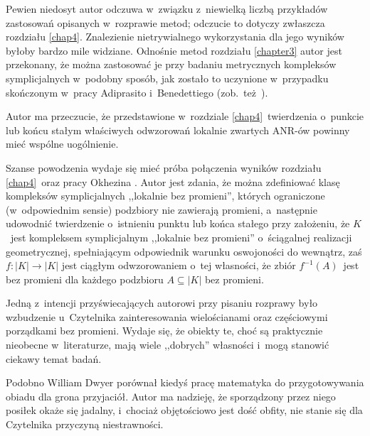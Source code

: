 Pewien niedosyt autor odczuwa w~związku z~niewielką liczbą przykładów zastosowań opisanych w~rozprawie metod; odczucie to dotyczy zwłaszcza rozdziału \ref{chap4}. Znalezienie nietrywialnego wykorzystania dla jego wyników byłoby bardzo mile widziane. Odnośnie metod rozdziału \ref{chapter3} autor jest przekonany, że można zastosować je przy badaniu metrycznych kompleksów symplicjalnych w~podobny sposób, jak zostało to uczynione w~przypadku skończonym w~pracy Adiprasito i~Benedettiego \cite{Adiprasito13} (zob.~też~\cite{Baralic}).

Autor ma przeczucie, że przedstawione w~rozdziale \ref{chap4}~twierdzenia o~punkcie lub końcu stałym właściwych odwzorowań lokalnie zwartych \mbox{ANR-ów} powinny mieć wspólne uogólnienie.

Szanse powodzenia wydaje się mieć próba połączenia wyników rozdziału \ref{chap4}~oraz pracy Okhezina \cite{Okhezin95}. Autor jest zdania, że można zdefiniować klasę kompleksów symplicjalnych ,,lokalnie bez promieni'', których ograniczone (w~odpowiednim sensie) podzbiory nie zawierają promieni, a~następnie udowodnić twierdzenie o~istnieniu punktu lub końca stałego przy założeniu, że $K$~jest kompleksem symplicjalnym ,,lokalnie bez promieni'' o~ściągalnej realizacji geometrycznej, spełniającym odpowiednik warunku oswojoności do wewnątrz, zaś $f\colon |K|\to |K|$ jest  ciągłym odwzorowaniem o~tej własności, że zbiór $f^{-1}(A)$~jest bez promieni dla każdego podzbioru $A\subseteq |K|$ bez promieni.

Jedną z~intencji przyświecających autorowi przy pisaniu rozprawy było wzbudzenie u~Czytelnika zainteresowania wielościanami oraz częściowymi porządkami bez promieni. Wydaje się, że obiekty te, choć są praktycznie nieobecne w~literaturze, mają wiele ,,dobrych'' własności i~mogą stanowić ciekawy temat badań.

Podobno \cite{178993} William Dwyer porównał kiedyś pracę matematyka do przygotowywania obiadu dla grona przyjaciół. Autor ma nadzieję, że sporządzony przez niego posiłek okaże się jadalny, i~chociaż objętościowo jest dość obfity, nie stanie się dla Czytelnika przyczyną niestrawności.
\newpage\thispagestyle{empty}

